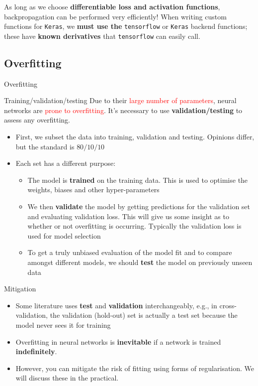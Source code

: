 \documentclass{beamer}
\begin{document}
\begin{frame}
As long as we choose \textbf{differentiable loss and activation functions}, backpropagation can be performed very efficiently!\linebreak
When writing custom functions for \texttt{Keras}, we \textbf{must use the} \texttt{tensorflow} or  \texttt{Keras} backend functions; these have \textbf{known derivatives} that \texttt{tensorflow} can easily call.
\end{frame}
\subsection{Overfitting}
\begin{frame}
\begin{center}
\Huge Overfitting
\end{center}
\end{frame}
\begin{frame}{Training/validation/testing}
Due to their \textcolor{red}{large number of parameters}, neural networks are \textcolor{red}{prone to overfitting}. It's necessary to use \textbf{validation/testing} to assess any overfitting.
\begin{itemize}
\item First, we subset the data into training, validation and testing. Opinions differ, but the standard is $80/10/10$
\item Each set has a different purpose:
\begin{itemize}
\item The model is \textbf{trained} on the training data. This is used to optimise the weights, biases and other hyper-parameters
\item We then \textbf{validate} the model by getting predictions for the validation set and evaluating validation loss. This will give us some insight as to whether or not overfitting is occurring. Typically the validation loss is used for model selection
\item To get a truly unbiased evaluation of the model fit and to compare amongst different models, we should \textbf{test} the model on  previously unseen data
\end{itemize}
\end{itemize}
\end{frame}

\begin{frame}{Mitigation}
\begin{itemize}
\item Some literature uses \textbf{test} and \textbf{validation} interchangeably, e.g., in cross-validation, the validation (hold-out) set is actually a test set because the model never sees it for training
\item Overfitting in neural networks is \textbf{inevitable} if a network is trained \textbf{indefinitely}. 
\item However, you can mitigate the risk of fitting using forms of regularisation. We will discuss these in the practical.
\end{itemize}
\end{frame}
\end{document}
